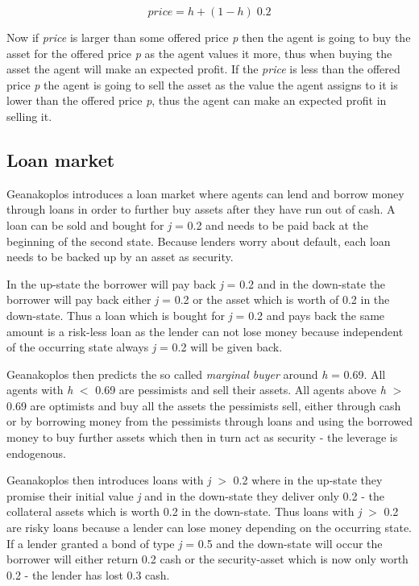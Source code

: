 \documentclass[../Bachelorarbeit.tex]{subfiles}
\begin{document}
\begin{equation}
price = h + (1 - h) \; 0.2
\end{equation}

Now if \textit{price} is larger than some offered price \textit{p} then the agent is going to buy the asset for the offered price \textit{p} as the agent values it more, thus when buying the asset the agent will make an expected profit. If the \textit{price} is less than the offered price \textit{p} the agent is going to sell the asset as the value the agent assigns to it is lower than the offered price \textit{p}, thus the agent can make an expected profit in selling it.

\subsection{Loan market}
Geanakoplos introduces a loan market where agents can lend and borrow money through loans in order to further buy assets after they have run out of cash. A loan can be sold and bought for \textit{j} = 0.2 and needs to be paid back at the beginning of the second state. Because lenders worry about default, each loan needs to be backed up by an asset as security.

\medskip

In the up-state the borrower will pay back \textit{j} = 0.2 and in the down-state the borrower will pay back either \textit{j} = 0.2 or the asset which is worth of 0.2 in the down-state. Thus a loan which is bought for \textit{j} = 0.2 and pays back the same amount is a risk-less loan as the lender can not lose money because independent of the occurring state always \textit{j} = 0.2 will be given back.

\medskip

Geanakoplos then predicts the so called \textit{marginal buyer} around \textit{h} = 0.69. All agents with \textit{h} $<$ 0.69 are pessimists and sell their assets. All agents above \textit{h} $>$ 0.69 are optimists and buy all the assets the pessimists sell, either through cash or by borrowing money from the pessimists through loans and using the borrowed money to buy further assets which then in turn act as security - the leverage is endogenous.

\medskip

Geanakoplos then introduces loans with \textit{j} $>$ 0.2 where in the up-state they promise their initial value \textit{j} and in the down-state they deliver only 0.2 - the collateral assets which is worth 0.2 in the down-state. Thus loans with \textit{j} $>$ 0.2 are risky loans because a lender can lose money depending on the occurring state. If a lender granted a bond of type \textit{j} = 0.5 and the down-state will occur the borrower will either return 0.2 cash or the security-asset which is now only worth 0.2 - the lender has lost 0.3 cash.
\end{document}
